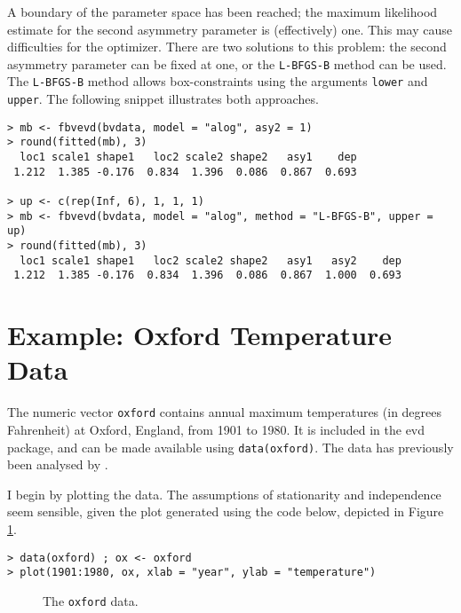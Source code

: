 \documentclass[11pt,a4paper]{article}
\begin{document}
A boundary of the parameter space has been reached; the maximum likelihood estimate for the second asymmetry parameter is (effectively) one.
This may cause difficulties for the optimizer.
There are two solutions to this problem: the second asymmetry parameter can be fixed at one, or the \verb+L-BFGS-B+ method can be used.
The \verb+L-BFGS-B+ method allows box-constraints using the arguments \verb+lower+ and \verb+upper+. 
The following snippet illustrates both approaches. 

\begin{verbatim}
> mb <- fbvevd(bvdata, model = "alog", asy2 = 1)
> round(fitted(mb), 3)
  loc1 scale1 shape1   loc2 scale2 shape2   asy1    dep 
 1.212  1.385 -0.176  0.834  1.396  0.086  0.867  0.693

> up <- c(rep(Inf, 6), 1, 1, 1)
> mb <- fbvevd(bvdata, model = "alog", method = "L-BFGS-B", upper = up)
> round(fitted(mb), 3)
  loc1 scale1 shape1   loc2 scale2 shape2   asy1   asy2    dep 
 1.212  1.385 -0.176  0.834  1.396  0.086  0.867  1.000  0.693
\end{verbatim}


\section{Example: Oxford Temperature Data}
\setcounter{footnote}{0}
\label{egoxford}

The numeric vector \verb+oxford+ contains annual maximum temperatures (in degrees Fahrenheit) at Oxford, England, from 1901 to 1980.
It is included in the evd package, and can be made available using \verb+data(oxford)+. 
The data has previously been analysed by \citet{tabo83}.

I begin by plotting the data.
The assumptions of stationarity and independence seem sensible, given the plot generated using the code below, depicted in Figure \ref{oxdata}.

\begin{verbatim}
> data(oxford) ; ox <- oxford
> plot(1901:1980, ox, xlab = "year", ylab = "temperature")
\end{verbatim}

\begin{figure}
\begin{center}
\vspace{-1.5cm}
\end{center}
\caption{The \texttt{oxford} data.}
\label{oxdata}
\end{figure}
\end{document}
